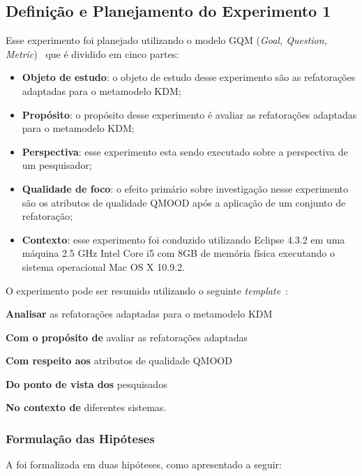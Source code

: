 \subsection{Definição e Planejamento do Experimento 1}

Esse experimento foi planejado utilizando o modelo GQM (\textit{Goal, Question, Metric})~\cite{Wohlin} que é dividido em cinco partes: 

\begin{itemize}
\item \textbf{Objeto de estudo}: o objeto de estudo desse experimento são as refatorações adaptadas para o metamodelo KDM;
\item \textbf{Propósito}: o propósito desse experimento é avaliar as refatorações adaptadas para o metamodelo KDM;
\item \textbf{Perspectiva}: esse experimento esta sendo executado sobre a perspectiva de um pesquisador;
\item \textbf{Qualidade de foco}: o efeito primário sobre investigação nesse experimento são os atributos de qualidade QMOOD após a aplicação de um conjunto de refatoração;
\item \textbf{Contexto}: esse experimento foi conduzido utilizando Eclipse 4.3.2 em uma máquina 2.5 GHz Intel Core i5 com 8GB de memória física executando o sistema operacional Mac OS X 10.9.2.
\end{itemize}


O experimento pode ser resumido utilizando o seguinte \textit{template}~\cite{Wohlin}:

\textbf{Analisar} as refatorações adaptadas para o metamodelo KDM

\textbf{Com o propósito de} avaliar as refatorações adaptadas 

\textbf{Com respeito aos} atributos de qualidade QMOOD

\textbf{Do ponto de vista dos} pesquisados

\textbf{No contexto de } diferentes sistemas.

\subsubsection{Formulação das Hipóteses}

A  foi formalizada em duas hipóteses, como apresentado a seguir:

